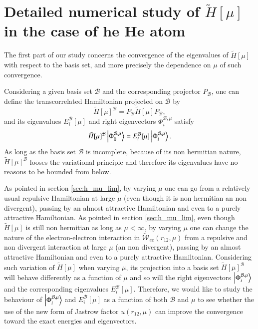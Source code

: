 \documentclass[aip,jcp,reprint,noshowkeys,superscriptaddress]{revtex4-1}
\newcommand{\phimub}[0]{\Phi^{\mathcal{B},\mu}_0}
\newcommand{\phiimub}[0]{\Phi^{\mathcal{B},\mu}_i}
\newcommand{\basis}[0]{\mathcal{B}}
\begin{document}
\section{Detailed numerical study of $\tilde{H}[\mu]$ in the case of he He atom}
\label{sec:total_he}
The first part of our study concerns the convergence of the eigenvalues of $\tilde{H}[\mu]$ with respect to the basis set, and more precisely the dependence on $\mu$ of such convergence. 

Considering a given basis set $\basis$ and the corresponding projector $P_\basis$, one can define the transcorrelated Hamiltonian projected on $\basis$ by
\begin{equation}
 \tilde{H}[\mu]^{\basis} = P_\basis \tilde{H}[\mu] P_\basis,
\end{equation}
and its eigenvalues $E_i^{\basis}[\mu]$ and right eigenvectors $\phiimub$ satisfy 
\begin{equation}
 \tilde{H}[\mu]^{\basis} \ket{\phimub} = E_i^{\basis}[\mu] \ket{\phiimub}. 
\end{equation}
As long as the basis set $\basis$ is incomplete, because of its non hermitian nature, $\tilde{H}[\mu]^{\basis}$ looses the variational principle and therefore its eigenvalues have no reasons to be bounded from below.  

As pointed in section \ref{sec:h_mu_lim}, by varying $\mu$ one can go from a relatively usual repulsive Hamiltonian at large $\mu$ (even though it is non hermitian an non divergent), passing by an almost attractive Hamiltonian and even to a purely attractive Hamiltonian. 
As pointed in section \ref{sec:h_mu_lim}, even though $\tilde{H}[\mu]$ is still non hermitian as long as $\mu < \infty$, by varying $\mu$ one can change the nature of the electron-electron interaction in $\tilde{\mathcal{W}}_{ee}(r_{12},\mu)$ from a repulsive and non divergent interaction at large $\mu$ (an non divergent), passing by an almost attractive Hamiltonian and even to a purely attractive Hamiltonian. 
Considering such variation of $\tilde{H}[\mu]$ when varying $\mu$,  
its projection into a basis set $\tilde{H}[\mu]^{\basis}$ will behave differently as a function of $\mu$ 
and so will the right eigenvectors $\ket{\phiimub}$ and the corresponding eigenvalues $E_i^{\basis}[\mu]$. 
Therefore, we would like to study the behaviour of $\ket{\phiimub}$ and $E_i^{\basis}[\mu]$ as a function of both $\basis$ and $\mu$ to see whether the use of the new form of Jastrow factor $u(r_{12},\mu)$ can improve the convergence toward the exact energies  and eigenvectors. 
\end{document}
